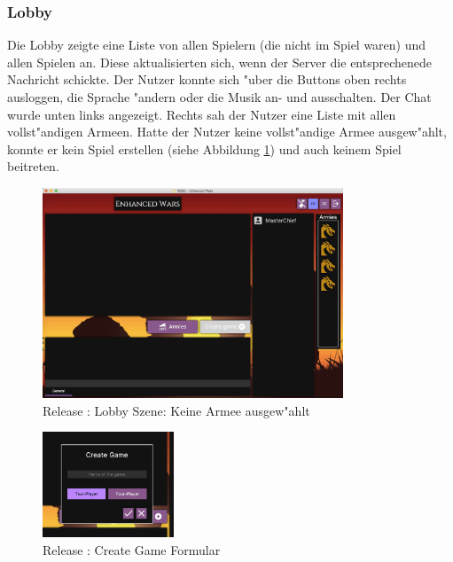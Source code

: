 \documentclass[12pt, titlepage]{scrartcl}
\newcommand{\RN}[1]{%
	\textup{\uppercase\expandafter{\romannumeral#1}}%
}
\begin{document}
            \subsubsection{Lobby} \label{LOBBY}
                Die Lobby zeigte eine Liste von allen Spielern (die nicht im Spiel waren) und allen Spielen an. Diese aktualisierten sich, wenn der Server die entsprechenede Nachricht schickte. Der Nutzer konnte sich "uber die Buttons oben rechts ausloggen, die Sprache "andern oder die Musik an- und ausschalten. Der Chat wurde unten links angezeigt. Rechts sah der Nutzer eine Liste mit allen vollst"andigen Armeen. Hatte der Nutzer keine vollst"andige Armee ausgew"ahlt, konnte er kein Spiel erstellen (siehe Abbildung \ref{Lobby_No_Army_Selected}) und auch keinem Spiel beitreten. \\
                \begin{figure}[H] 
    				\centering
    				\includegraphics[width=0.8\textwidth]{images/old_state/lobby/NoArmySelected.png}
    				\caption{Release \RN{2}: Lobby Szene: Keine Armee ausgew"ahlt}
    				\label{Lobby_No_Army_Selected}
			    \end{figure}
			    \begin{figure}
                    \begin{center}
                        \includegraphics[width=0.35\textwidth]{images/old_state/lobby/CreateGame.png}
                    \end{center}
                    \caption{Release \RN{2}: Create Game Formular}
                    \label{Create_Game}
                \end{figure}
\end{document}
